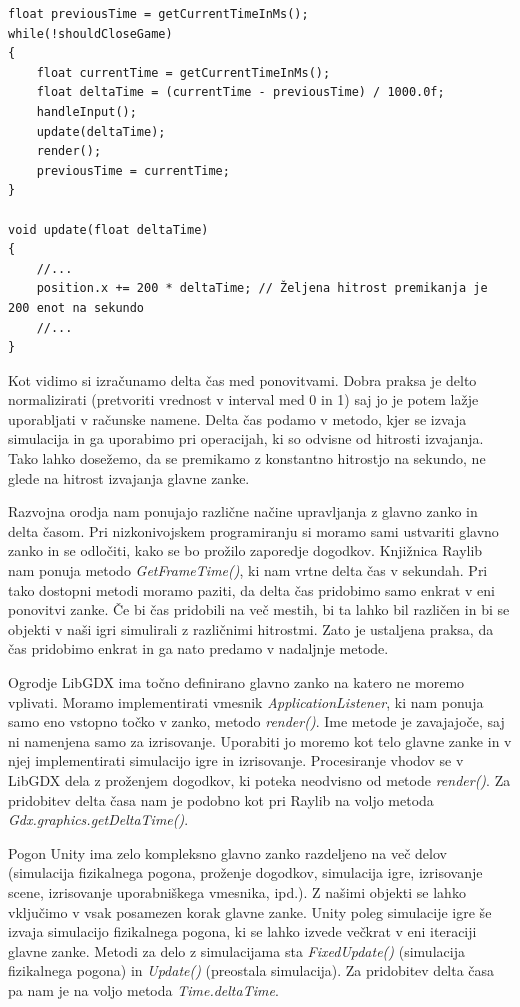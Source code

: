 \documentclass[12pt,a4paper,twoside]{book}
\begin{document}
\begin{listing}[ht]
\begin{verbatim}
float previousTime = getCurrentTimeInMs();
while(!shouldCloseGame)
{
	float currentTime = getCurrentTimeInMs();
	float deltaTime = (currentTime - previousTime) / 1000.0f;
	handleInput();
	update(deltaTime);
	render();
	previousTime = currentTime;
}

void update(float deltaTime)
{
	//...
	position.x += 200 * deltaTime; // Željena hitrost premikanja je 200 enot na sekundo
	//...
}
\end{verbatim}
\vspace*{-2em}
\end{listing}
Kot vidimo si izračunamo delta čas med ponovitvami. Dobra praksa je delto normalizirati (pretvoriti vrednost v interval med 0 in 1) saj jo je potem lažje uporabljati v računske namene. Delta čas podamo v metodo, kjer se izvaja simulacija in ga uporabimo pri operacijah, ki so odvisne od hitrosti izvajanja. Tako lahko dosežemo, da se premikamo z konstantno hitrostjo na sekundo, ne glede na hitrost izvajanja glavne zanke.

Razvojna orodja nam ponujajo različne načine upravljanja z glavno zanko in delta časom. Pri nizkonivojskem programiranju si moramo sami ustvariti glavno zanko in se odločiti, kako se bo prožilo zaporedje dogodkov. Knjižnica Raylib nam ponuja metodo \textit{GetFrameTime()}, ki nam vrtne delta čas v sekundah. Pri tako dostopni metodi moramo paziti, da delta čas pridobimo samo enkrat v eni ponovitvi zanke. Če bi čas pridobili na več mestih, bi ta lahko bil različen in bi se objekti v naši igri simulirali z različnimi hitrostmi. Zato je ustaljena praksa, da čas pridobimo enkrat in ga nato predamo v nadaljnje metode.

Ogrodje LibGDX ima točno definirano glavno zanko na katero ne moremo vplivati. Moramo implementirati vmesnik \textit{ApplicationListener}, ki nam ponuja samo eno vstopno točko v zanko, metodo \textit{render()}. Ime metode je zavajajoče, saj ni namenjena samo za izrisovanje. Uporabiti jo moremo kot telo glavne zanke in v njej implementirati simulacijo igre in izrisovanje. Procesiranje vhodov se v LibGDX dela z proženjem dogodkov, ki poteka neodvisno od metode \textit{render()}. Za pridobitev delta časa nam je podobno kot pri Raylib na voljo metoda \textit{Gdx.graphics.getDeltaTime()}.

Pogon Unity ima zelo kompleksno glavno zanko razdeljeno na več delov (simulacija fizikalnega pogona, proženje dogodkov, simulacija igre, izrisovanje scene, izrisovanje uporabniškega vmesnika, ipd.). Z našimi objekti se lahko vključimo v vsak posamezen korak glavne zanke. Unity poleg simulacije igre še izvaja simulacijo fizikalnega pogona, ki se lahko izvede večkrat v eni iteraciji glavne zanke. Metodi za delo z simulacijama sta \textit{FixedUpdate()} (simulacija fizikalnega pogona) in \textit{Update()} (preostala simulacija). Za pridobitev delta časa pa nam je na voljo metoda \textit{Time.deltaTime}.
\end{document}
